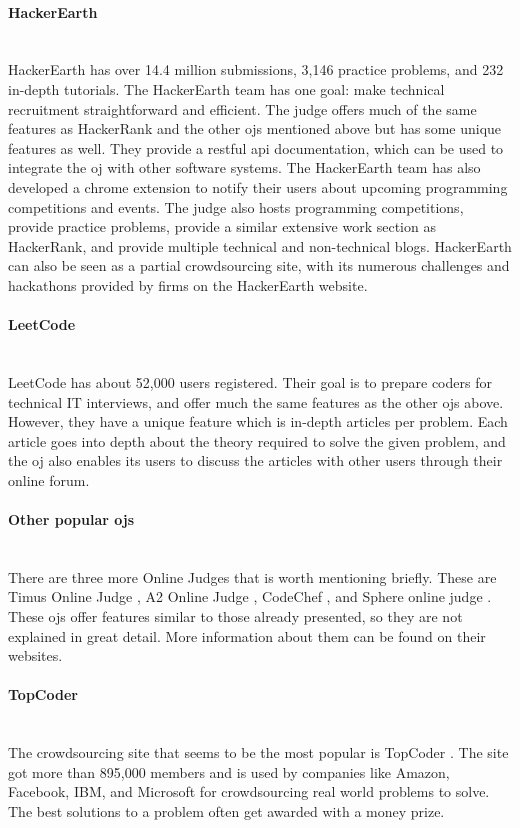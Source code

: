 \paragraph*{HackerEarth} \hfill \\
HackerEarth \cite{HACKEREARTH} has over 14.4 million submissions, 3,146 practice problems, and 232 in-depth tutorials. The HackerEarth team has one goal: make technical recruitment straightforward and efficient. The judge offers much of the same features as HackerRank and the other \gls{ojs} mentioned above but has some unique features as well. They provide a \gls{rest}ful \gls{api} documentation, which can be used to integrate the \gls{oj} with other software systems. The HackerEarth team has also developed a chrome extension to notify their users about upcoming programming competitions and events. The judge also hosts programming competitions, provide practice problems, provide a similar extensive work section as HackerRank, and provide multiple technical and non-technical blogs. HackerEarth can also be seen as a partial crowdsourcing site, with its numerous challenges and hackathons provided by firms on the HackerEarth website.

\paragraph*{LeetCode} \hfill \\
LeetCode \cite{LEETCODE} has about 52,000 users registered. Their goal is to prepare coders for technical IT interviews, and offer much the same features as the other \gls{ojs} above. However, they have a unique feature which is in-depth articles per problem. Each article goes into depth about the theory required to solve the given problem, and the \gls{oj} also enables its users to discuss the articles with other users through their online forum.
\clearpage
\paragraph*{Other popular \gls{ojs}} \hfill \\
There are three more Online Judges that is worth mentioning briefly. These are Timus Online Judge \cite{TIMUS}, A2 Online Judge \cite{A2OJ}, CodeChef \cite{CODECHEF}, and Sphere online judge \cite{SPHERE}. These \gls{ojs} offer features similar to those already presented, so they are not explained in great detail. More information about them can be found on their websites.

\paragraph*{TopCoder} \hfill \\
The crowdsourcing site that seems to be the most popular is TopCoder \cite{TOPCODER}. The site got more than 895,000 members and is used by companies like Amazon, Facebook, IBM, and Microsoft for crowdsourcing real world problems to solve. The best solutions to a problem often get awarded with a money prize.

